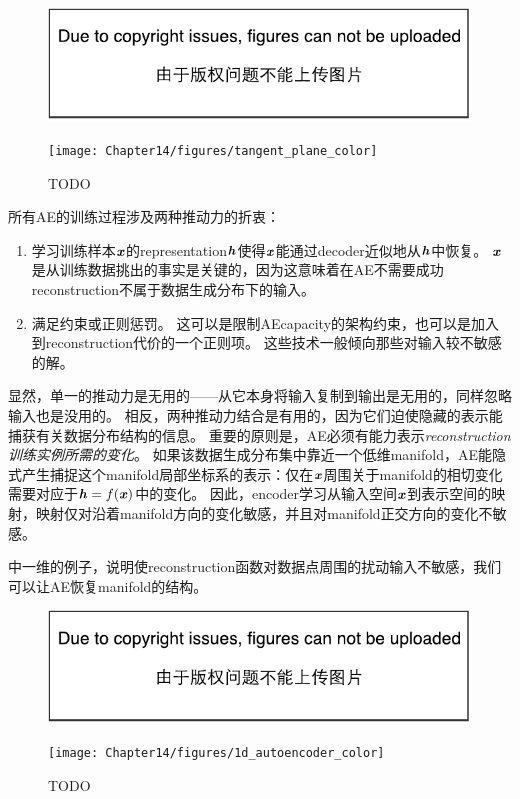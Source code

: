 \begin{figure}[!htb]
\ifOpenSource
\centerline{\includegraphics{figure.pdf}}
\else
\centerline{\texttt{[image: Chapter14/figures/tangent\_plane\_color]}}
\fi
\caption{TODO}
\label{fig:chap14_tangent_plane_color}
\end{figure}


所有\gls{AE}的训练过程涉及两种推动力的折衷：
\begin{enumerate}
 \item 学习训练样本$\boldsymbol{\mathit{x}}$的\gls{representation}$\boldsymbol{\mathit{h}}$使得$\boldsymbol{\mathit{x}}$能通过\gls{decoder}近似地从$\boldsymbol{\mathit{h}}$中恢复。
$\boldsymbol{\mathit{x}}$是从训练数据挑出的事实是关键的，因为这意味着在\gls{AE}不需要成功\gls{reconstruction}不属于数据生成分布下的输入。
 \item 满足约束或正则惩罚。
这可以是限制\gls{AE}\gls{capacity}的架构约束，也可以是加入到\gls{reconstruction}代价的一个正则项。
这些技术一般倾向那些对输入较不敏感的解。
\end{enumerate}


显然，单一的推动力是无用的——从它本身将输入复制到输出是无用的，同样忽略输入也是没用的。
相反，两种推动力结合是有用的，因为它们迫使隐藏的表示能捕获有关数据分布结构的信息。
重要的原则是，\gls{AE}必须有能力表示\emph{\gls{reconstruction}训练实例所需的变化}。
如果该数据生成分布集中靠近一个低维\gls{manifold}，\gls{AE}能隐式产生捕捉这个\gls{manifold}局部坐标系的表示：仅在$\boldsymbol{\mathit{x}}$周围关于\gls{manifold}的相切变化需要对应于$\boldsymbol{\mathit{h}}=f(\boldsymbol{\mathit{x}})$中的变化。
因此，\gls{encoder}学习从输入空间$\boldsymbol{\mathit{x}}$到表示空间的映射，映射仅对沿着\gls{manifold}方向的变化敏感，并且对\gls{manifold}正交方向的变化不敏感。


中一维的例子，说明使\gls{reconstruction}函数对数据点周围的扰动输入不敏感，我们可以让\gls{AE}恢复\gls{manifold}的结构。

\begin{figure}[!htb]
\ifOpenSource
\centerline{\includegraphics{figure.pdf}}
\else
\centerline{\texttt{[image: Chapter14/figures/1d\_autoencoder\_color]}}
\fi
\caption{TODO}
\label{fig:chap14_1d_autoencoder_color}
\end{figure}

